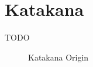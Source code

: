 
\section{Katakana}\label{sec:Katakana}



TODO

\begin{figure}[H]
\begin{center}

\caption{Katakana Origin}
\label{fig:KatakanaOrigin} %
\end{center}
\end{figure}


